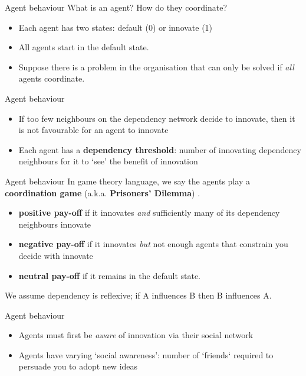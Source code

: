 \documentclass[10pt, xcolor=dvipsnames, handout]{beamer}
\begin{document}
\begin{frame}{Agent behaviour}
What is an agent? How do they coordinate? \cite{granell_dynamical_2013}
\begin{itemize}
\pause \item Each agent has two states: default (0) or innovate (1)
\pause \item All agents start in the default state.
\pause \item Suppose there is a problem in the organisation that can only be solved if \emph{all} agents coordinate.
\end{itemize}
\end{frame}



\begin{frame}{Agent behaviour}
\begin{itemize}
\pause \item If too few neighbours on the dependency network decide to innovate, then it is not favourable for an agent to innovate
\pause \item Each agent has a \textbf{dependency threshold}: number of innovating dependency neighbours for it to `see' the benefit of innovation
\end{itemize}
\end{frame}

\begin{frame}{Agent behaviour}
In game theory language, we say the agents play a \textbf{coordination game} (a.k.a. \textbf{Prisoners' Dilemma}) \cite{shoham_multiagent_2008} \cite{jackson_games_2014}.
\begin{itemize}
\pause \item \textbf{positive pay-off} if it innovates \emph{and} sufficiently many of its dependency neighbours innovate
\pause \item \textbf{negative pay-off} if it innovates \emph{but} not enough agents that constrain you decide with innovate
\pause \item \textbf{neutral pay-off} if it remains in the default state.
\end{itemize}
We assume dependency is reflexive; if A influences B then B influences A.
\end{frame}

\begin{frame}{Agent behaviour}
\begin{itemize}
\pause \item Agents must first be \emph{aware} of innovation via their social network
\pause \item Agents have varying `social awareness': number of `friends` required to persuade you to adopt new ideas
\end{itemize}
\end{frame}
\end{document}

